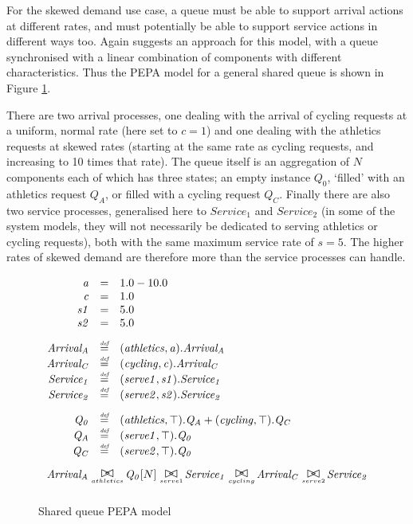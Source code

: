 For the skewed demand use case, a queue must be able to support arrival actions at different rates, and must potentially be able to support service actions in different ways too.  Again \cite{RN75} suggests an approach for this model, with a queue synchronised with a linear combination of components with different characteristics.  Thus the PEPA model for a general shared queue is shown in Figure \ref{figure:pepa_queue_model}.

There are two arrival processes, one dealing with the arrival of cycling requests at a uniform, normal rate (here set to $\mathit{c=1}$) and one dealing with the athletics requests at skewed rates (starting at the same rate as cycling requests, and increasing to 10 times that rate).  The queue itself is an aggregation of $\mathit{N}$ components each of which has three states; an empty instance $\mathit{Q_0}$, `filled' with an athletics request $\mathit{Q_A}$, or filled with a cycling request $\mathit{Q_C}$.  Finally there are also two service processes, generalised here to $\mathit{Service_1}$ and $\mathit{Service_2}$ (in some of the system models, they will not necessarily be dedicated to serving athletics or cycling requests), both with the same maximum service rate of $\mathit{s=5}$.  The higher rates of skewed demand are therefore more than the service processes can handle.

\begin{figure}
	\caption{Shared queue PEPA model}
	\label{figure:pepa_queue_model}
	\centering
	\begin{displaymath}
		\begin{array}{rcl}
			\mathit{a} & = & 1.0-10.0\\
			\mathit{c} & = & 1.0\\
			\mathit{s1} & = & 5.0\\
			\mathit{s2} & = & 5.0\\
			[2.0ex]		\mathit{Arrival_A} & \rmdef & (\mathit{athletics},\mathit{a}).\mathit{Arrival_A}\\
			\mathit{Arrival_C} & \rmdef & (\mathit{cycling},\mathit{c}).\mathit{Arrival_C}\\
			\mathit{Service_1} & \rmdef & (\mathit{serve1},\mathit{s1}).\mathit{Service_1}\\
			\mathit{Service_2} & \rmdef & (\mathit{serve2},\mathit{s2}).\mathit{Service_2}\\
			[2.0ex]		\mathit{Q_0} & \rmdef & (\mathit{athletics},\top).\mathit{Q_A}+(\mathit{cycling},\top).\mathit{Q_C}\\
			\mathit{Q_A} & \rmdef & (\mathit{serve1},\top).\mathit{Q_0}\\
			\mathit{Q_C} & \rmdef & (\mathit{serve2},\top).\mathit{Q_0}\\
			[2.0ex]		\multicolumn{3}{l}{\mathit{Arrival_A}\sync{athletics}\mathit{Q_0}[N]\sync{serve1}\mathit{Service_1}\sync{cycling}\mathit{Arrival_C}\sync{serve2}\mathit{Service_2}}\\
			[2.0ex]	\end{array}
	\end{displaymath}
\end{figure}

